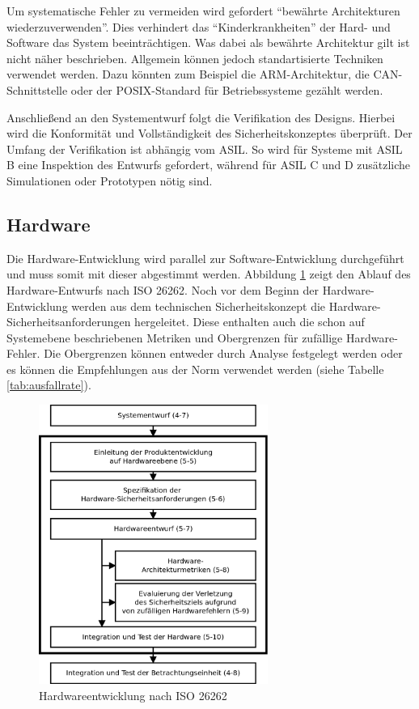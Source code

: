 \documentclass[a4paper,DIV=calc,ngerman]{scrartcl}
\begin{document}
Um systematische Fehler zu vermeiden wird gefordert "`bewährte Architekturen wiederzuverwenden"'. Dies verhindert das "`Kinderkrankheiten"' der Hard- und Software das System beeinträchtigen. Was dabei als bewährte Architektur gilt ist nicht näher beschrieben. Allgemein können jedoch standartisierte Techniken verwendet werden. Dazu könnten zum Beispiel die ARM-Architektur, die CAN-Schnittstelle oder der POSIX-Standard für Betriebssysteme gezählt werden.

Anschließend an den Systementwurf folgt die Verifikation des Designs. Hierbei wird die Konformität und Vollständigkeit des Sicherheitskonzeptes überprüft. Der Umfang der Verifikation ist abhängig vom ASIL. So wird für Systeme mit ASIL B eine Inspektion des Entwurfs gefordert, während für ASIL C und D zusätzliche Simulationen oder Prototypen nötig sind.




\subsection{Hardware}
\label{sec:Hardware}

Die Hardware-Entwicklung wird parallel zur Software-Entwicklung durchgeführt und muss somit mit dieser abgestimmt werden. Abbildung \ref{fig:hardware} zeigt den Ablauf des Hardware-Entwurfs nach ISO 26262. Noch vor dem Beginn der Hardware-Entwicklung werden aus dem technischen Sicherheitskonzept die Hardware-Sicherheitsanforderungen hergeleitet. Diese enthalten auch die schon auf Systemebene beschriebenen Metriken und Obergrenzen für zufällige Hardware-Fehler. Die Obergrenzen können entweder durch Analyse festgelegt werden oder es können die Empfehlungen aus der Norm verwendet werden (siehe Tabelle \ref{tab:ausfallrate}). 

\begin{figure}[h]
\centering
\includegraphics[width=7.5cm]{Abb_6_4}
\caption{Hardwareentwicklung nach ISO 26262\cite{1}}
\label{fig:hardware}
\end{figure}
\end{document}
